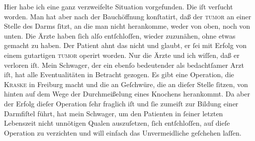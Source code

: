 \pstart
           Hier habe ich eine ganz
               verzweifelte Situation vorgefunden. Die \label{K_L03243-2v}\label{K_L03243-2} iſt verſucht worden. Man hat aber nach der Bauchöffnung konſtatirt, daß der
                  \textsc{tumor} an einer Stelle des Darms ſitzt, an die man nicht
               herankomme, weder von oben, noch von unten. Die Ärzte haben ſich alſo entſchloſſen,
               wieder zuzunähen, ohne etwas gemacht zu haben. Der Patient ahnt das nicht und glaubt, er ſei
               mit Erfolg von einem gutartigen \textsc{tumor} operirt worden. Nur
               die Ärzte und ich wiſſen, daß er verloren iſt. {\pb}Mein
                  Schwager, der ein ebenſo
               bedeutender als bedachtſamer Arzt iſt, hat alle Eventualitäten in Betracht gezogen.
               Es gibt eine Operation, die \textsc{Kraske} in Freiburg macht und die an Geſchwüre, die
               an dieſer Stelle ſitzen, von hinten auf dem Wege der Durchmeißelung eines Knochens
               herankommt. Da aber der Erfolg dieſer Operation ſehr fraglich iſt und ſie zumeiſt zur
               Bildung einer Darmfiſtel führt, hat mein Schwager, um den Patienten in ſeiner letzten Lebenszeit nicht unnötigen Qualen
               auszuſetzen, ſich entſchloſſen, auf dieſe Operation zu verzichten und will einfach
               das Unvermeidliche geſchehen laſſen.\pend
           
